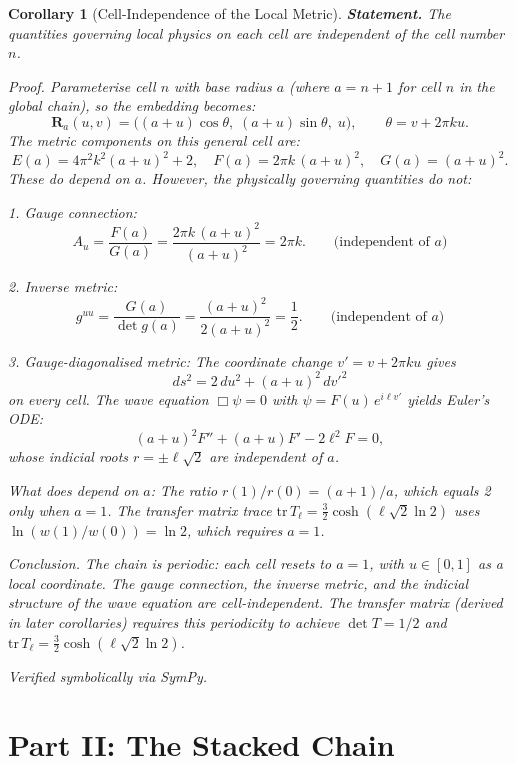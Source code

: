 \documentclass[12pt]{amsart}
\newtheorem{corollary}{Corollary}
\begin{document}
\begin{corollary}[Cell-Independence of the Local Metric]
\textbf{Statement.} The quantities governing local physics on each cell are independent of
the cell number $n$.

\textit{Proof.} Parameterise cell $n$ with base radius $a$ (where $a = n+1$ for cell $n$
in the global chain), so the embedding becomes:
\[
  \mathbf{R}_a(u,v) = \bigl((a+u)\cos\theta,\; (a+u)\sin\theta,\; u\bigr),
  \qquad \theta = v + 2\pi k u.
\]
The metric components on this general cell are:
\[
  E(a) = 4\pi^2 k^2(a+u)^2 + 2, \quad
  F(a) = 2\pi k\,(a+u)^2, \quad
  G(a) = (a+u)^2.
\]
These do depend on $a$. However, the physically governing quantities do not:

1. \textit{Gauge connection:}
\[
  A_u = \frac{F(a)}{G(a)} = \frac{2\pi k\,(a+u)^2}{(a+u)^2} = 2\pi k.
  \qquad \text{(independent of $a$)}
\]

2. \textit{Inverse metric:}
\[
  g^{uu} = \frac{G(a)}{\det g(a)} = \frac{(a+u)^2}{2(a+u)^2} = \frac{1}{2}.
  \qquad \text{(independent of $a$)}
\]

3. \textit{Gauge-diagonalised metric:} The coordinate change $v' = v + 2\pi k u$ gives
\[
  ds^2 = 2\, du^2 + (a+u)^2\, dv'^2
\]
on every cell. The wave equation $\Box\psi = 0$ with $\psi = F(u)\, e^{i\ell v'}$ yields
Euler's ODE:
\[
  (a+u)^2 F'' + (a+u) F' - 2\ell^2 F = 0,
\]
whose indicial roots $r = \pm\ell\sqrt{2}$ are independent of $a$.

\textit{What does depend on $a$:} The ratio $r(1)/r(0) = (a+1)/a$, which equals 2 only
when $a = 1$. The transfer matrix trace
$\mathrm{tr}\, T_\ell = \tfrac{3}{2}\cosh(\ell\sqrt{2}\ln 2)$ uses
$\ln(w(1)/w(0)) = \ln 2$, which requires $a = 1$.

\textit{Conclusion.} The chain is periodic: each cell resets to $a = 1$, with $u \in [0,1]$
as a local coordinate. The gauge connection, the inverse metric, and the indicial structure of
the wave equation are cell-independent. The transfer matrix (derived in later corollaries)
requires this periodicity to achieve $\det T = 1/2$ and
$\mathrm{tr}\, T_\ell = \tfrac{3}{2}\cosh(\ell\sqrt{2}\ln 2)$.

Verified symbolically via SymPy.
\end{corollary}


\section{Part II: The Stacked Chain}
\end{document}
